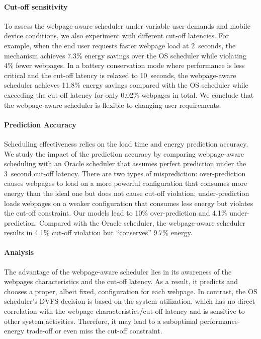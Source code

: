 \paragraph{Cut-off sensitivity} To assess the webpage-aware scheduler under variable user demands and mobile device conditions, we also experiment with different cut-off latencies. For example, when the end user requests faster webpage load at 2~seconds, the mechanism achieves 7.3\% energy savings over the OS scheduler while violating 4\% fewer webpages. In a battery conservation mode where performance is less critical and the cut-off latency is relaxed to 10~seconds, the webpage-aware scheduler achieves 11.8\% energy savings compared with the OS scheduler while exceeding the cut-off latency for only 0.02\% webpages in total. We conclude that the webpage-aware scheduler is flexible to changing user requirements.

\paragraph{Prediction Accuracy} Scheduling effectiveness relies on the load time and energy prediction accuracy. We study the impact of the prediction accuracy by comparing webpage-aware scheduling with an Oracle scheduler that assumes perfect prediction under the 3~second cut-off latency. There are two types of misprediction: over-prediction causes webpages to load on a more powerful configuration that consumes more energy than the ideal one but does not cause cut-off violation; under-prediction loads webpages on a weaker configuration that consumes less energy but violates the cut-off constraint.  Our models lead to 10\% over-prediction and 4.1\% under-prediction. Compared with the Oracle scheduler, the webpage-aware scheduler results in 4.1\% cut-off violation but ``conserves'' 9.7\% energy.

\paragraph{Analysis} The advantage of the webpage-aware scheduler lies in its awareness of the webpages characteristics and the cut-off latency. As a result, it predicts and chooses a proper, albeit fixed, configuration for each webpage. In contrast, the OS scheduler's DVFS decision is based on the system utilization, which has no direct correlation with the webpage characteristics/cut-off latency and is sensitive to other system activities. Therefore, it may lead to a suboptimal performance-energy trade-off or even miss the cut-off constraint.


